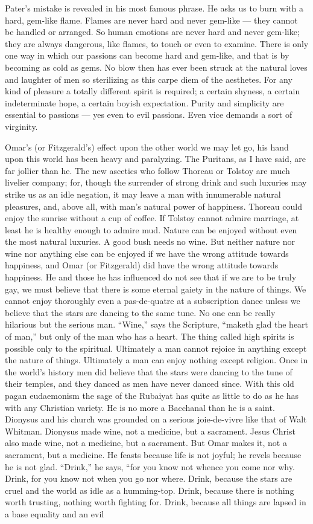 Pater’s mistake is revealed in his most famous phrase. He asks us to burn with a hard, gem-like flame. Flames are never hard and never gem-like — they cannot be handled or arranged. So human emotions are never hard and never gem-like; they are always dangerous, like flames, to touch or even to examine. There is only one way in which our passions can become hard and gem-like, and that is by becoming as cold as gems. No blow then has ever been struck at the natural loves and laughter of men so sterilizing as this carpe diem of the aesthetes. For any kind of pleasure a totally different spirit is required; a certain shyness, a certain indeterminate hope, a certain boyish expectation. Purity and simplicity are essential to passions — yes even to evil passions. Even vice demands a sort of virginity.

Omar’s (or Fitzgerald’s) effect upon the other world we may let go, his hand upon this world has been heavy and paralyzing. The Puritans, as I have said, are far jollier than he. The new ascetics who follow Thoreau or Tolstoy are much livelier company; for, though the surrender of strong drink and such luxuries may strike us as an idle negation, it may leave a man with innumerable natural pleasures, and, above all, with man’s natural power of happiness. Thoreau could enjoy the sunrise without a cup of coffee. If Tolstoy cannot admire marriage, at least he is healthy enough to admire mud. Nature can be enjoyed without even the most natural luxuries. A good bush needs no wine. But neither nature nor wine nor anything else can be enjoyed if we have the wrong attitude towards happiness, and Omar (or Fitzgerald) did have the wrong attitude towards happiness. He and those he has influenced do not see that if we are to be truly gay, we must believe that there is some eternal gaiety in the nature of things. We cannot enjoy thoroughly even a pas-de-quatre at a subscription dance unless we believe that the stars are dancing to the same tune. No one can be really hilarious but the serious man. “Wine,” says the Scripture, “maketh glad the heart of man,” but only of the man who has a heart. The thing called high spirits is possible only to the spiritual. Ultimately a man cannot rejoice in anything except the nature of things. Ultimately a man can enjoy nothing except religion. Once in the world’s history men did believe that the stars were dancing to the tune of their temples, and they danced as men have never danced since. With this old pagan eudaemonism the sage of the Rubaiyat has quite as little to do as he has with any Christian variety. He is no more a Bacchanal than he is a saint. Dionysus and his church was grounded on a serious joie-de-vivre like that of Walt Whitman. Dionysus made wine, not a medicine, but a sacrament. Jesus Christ also made wine, not a medicine, but a sacrament. But Omar makes it, not a sacrament, but a medicine. He feasts because life is not joyful; he revels because he is not glad. “Drink,” he says, “for you know not whence you come nor why. Drink, for you know not when you go nor where. Drink, because the stars are cruel and the world as idle as a humming-top. Drink, because there is nothing worth trusting, nothing worth fighting for. Drink, because all things are lapsed in a base equality and an evil 